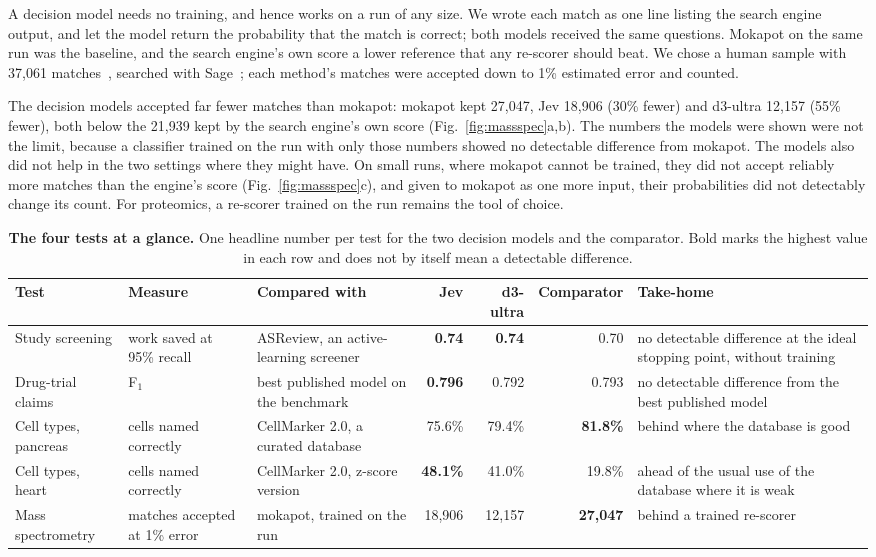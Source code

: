 \documentclass[10pt,twocolumn]{article}
\begin{document}
A decision model needs no training, and hence works on a run of any size. We wrote each match as one line listing the search engine output, and let the model return the probability that the match is correct; both models received the same questions. Mokapot on the same run was the baseline, and the search engine's own score a lower reference that any re-scorer should beat. We chose a human sample with 37,061 matches~\cite{chick}, searched with Sage~\cite{sage}; each method's matches were accepted down to 1\% estimated error and counted.

The decision models accepted far fewer matches than mokapot: mokapot kept 27,047, Jev 18,906 (30\% fewer) and d3-ultra 12,157 (55\% fewer), both below the 21,939 kept by the search engine's own score (Fig.~\ref{fig:massspec}a,b). The numbers the models were shown were not the limit, because a classifier trained on the run with only those numbers showed no detectable difference from mokapot. The models also did not help in the two settings where they might have. On small runs, where mokapot cannot be trained, they did not accept reliably more matches than the engine's score (Fig.~\ref{fig:massspec}c), and given to mokapot as one more input, their probabilities did not detectably change its count. For proteomics, a re-scorer trained on the run remains the tool of choice.

\begin{table}[t]\centering\small
\caption{\textbf{The four tests at a glance.} One headline number per test for the two decision models and the comparator. Bold marks the highest value in each row and does not by itself mean a detectable difference.}
\label{tab:summary}
\setlength{\tabcolsep}{5pt}
\begin{tabular}{@{}>{\raggedright}p{2.2cm}>{\raggedright}p{2.4cm}>{\raggedright}p{2.8cm}rrr>{\raggedright\arraybackslash}p{3.6cm}@{}}
\toprule
Test & Measure & Compared with & Jev & d3-ultra & Comparator & Take-home\\
\midrule
Study screening & work saved at 95\% recall & ASReview, an active-learning screener & \textbf{0.74} & \textbf{0.74} & 0.70 & no detectable difference at the ideal stopping point, without training\\
\addlinespace
Drug-trial claims & F$_1$ & best published model on the benchmark & \textbf{0.796} & 0.792 & 0.793 & no detectable difference from the best published model\\
\addlinespace
Cell types, pancreas & cells named correctly & CellMarker 2.0, a curated database & 75.6\% & 79.4\% & \textbf{81.8\%} & behind where the database is good\\
\addlinespace
Cell types, heart & cells named correctly & CellMarker 2.0, z-score version & \textbf{48.1\%} & 41.0\% & 19.8\% & ahead of the usual use of the database where it is weak\\
\addlinespace
Mass spectrometry & matches accepted at 1\% error & mokapot, trained on the run & 18,906 & 12,157 & \textbf{27,047} & behind a trained re-scorer\\
\bottomrule
\end{tabular}
\end{table}
\end{document}
